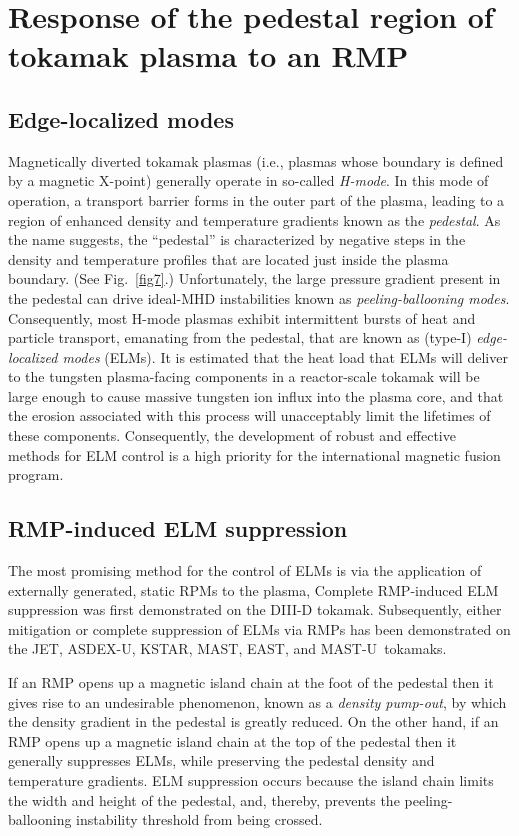 \documentclass[12pt,prb,aps]{revtex4-1}
\begin{document}
\section{Response of  the pedestal region of tokamak plasma to an RMP}\label{sect4}
\subsection{Edge-localized modes}
Magnetically diverted tokamak plasmas (i.e., plasmas whose boundary is defined by a magnetic X-point) generally operate in so-called {\em H-mode}.\cite{hmode} In this  mode of operation, a transport barrier forms in the outer part of 
the plasma, leading to a region of enhanced density and temperature gradients known as the {\em pedestal}. As the name suggests, the ``pedestal''
is characterized  by negative steps in the density and temperature profiles that are located just inside the plasma boundary. (See Fig.~\ref{fig7}.) 
Unfortunately, the large pressure gradient present in the pedestal can drive ideal-MHD instabilities known as {\em peeling-ballooning modes}.\cite{pb} Consequently, most H-mode plasmas exhibit intermittent bursts of heat and particle transport, emanating from the pedestal, that are known as (type-I)
{\em edge-localized modes}  (ELMs).\cite{elm}  It is estimated that the heat load that ELMs will
deliver to the tungsten plasma-facing components in a reactor-scale
tokamak will be large enough to cause massive tungsten ion influx
into the plasma core, and that the erosion associated with this process will
unacceptably limit the lifetimes of these components.\cite{elm1} Consequently,
the development of robust and effective methods for ELM control is a
high priority for the international magnetic fusion program.

\subsection{RMP-induced ELM suppression} 
The most promising method for the control of ELMs is via the
application of externally generated, static RPMs to the plasma, 
Complete RMP-induced ELM suppression was first demonstrated on
the DIII-D tokamak.\cite{elmx} Subsequently, either mitigation or complete suppression of ELMs via RMPs has been demonstrated on the JET,\cite{rmp2} 
ASDEX-U,\cite{rmp3} 
KSTAR,\cite{rmp4} MAST, \cite{rmp5} EAST, \cite{rmp6} and MAST-U\,\cite{rmp7} tokamaks.

If an RMP opens up a magnetic island chain at the foot of the pedestal then it gives rise to an undesirable  phenomenon, known as a
{\em density pump-out}, by which the density gradient in the pedestal  is greatly reduced.\cite{hu,hu1,hu2} On the other hand,
if an RMP opens up a magnetic island chain at the top of the pedestal then it generally suppresses ELMs,  while preserving the pedestal density and temperature 
gradients.\cite{hu,hu1,hu2,hu3,hu4}
ELM suppression occurs because the
island chain limits the width and height of the pedestal, and, thereby, prevents the peeling-ballooning instability threshold from being crossed.\cite{pb}
\end{document}
